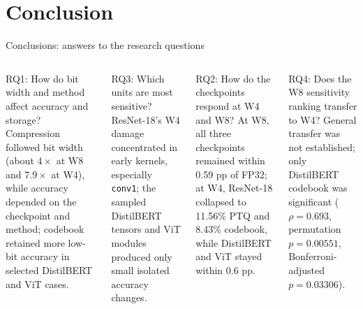\documentclass[aspectratio=169,10pt]{beamer}
\begin{document}
\section{Conclusion}
\begin{frame}{Conclusions: answers to the research questions}
\begin{columns}[T,onlytextwidth]
\begin{block}{RQ1: How do bit width and method affect accuracy and storage?}
\scriptsize Compression followed bit width (about $4\times$ at W8 and $7.9\times$ at W4), while accuracy depended on the checkpoint and method; codebook retained more low-bit accuracy in selected DistilBERT and ViT cases.
\end{block}
\vspace{1mm}
\begin{block}{RQ3: Which units are most sensitive?}
\scriptsize ResNet-18's W4 damage concentrated in early kernels, especially \texttt{conv1}; the sampled DistilBERT tensors and ViT modules produced only small isolated accuracy changes.
\end{block}

\begin{block}{RQ2: How do the checkpoints respond at W4 and W8?}
\scriptsize At W8, all three checkpoints remained within 0.59 pp of FP32; at W4, ResNet-18 collapsed to 11.56\% PTQ and 8.43\% codebook, while DistilBERT and ViT stayed within 0.6 pp.
\end{block}
\vspace{1mm}
\begin{block}{RQ4: Does the W8 sensitivity ranking transfer to W4?}
\scriptsize General transfer was not established; only DistilBERT codebook was significant ($\rho=0.693$, permutation $p=0.00551$, Bonferroni-adjusted $p=0.03306$).
\end{block}
\end{columns}
\end{frame}
\end{document}
